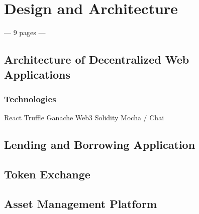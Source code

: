 \chapter{Design and Architecture}
--- 9 pages ---
\label{cha:DesignArchitecture}

\section{Architecture of Decentralized Web Applications}

\subsection{Technologies}
React
Truffle
Ganache
Web3
Solidity
Mocha / Chai

\section{Lending and Borrowing Application}


\section{Token Exchange}


\section{Asset Management Platform}
